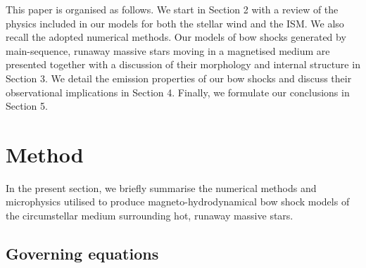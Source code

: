 \documentclass[useAMS,usenatbib]{mn2e}
\begin{document}
This paper is organised as follows. We start in Section 2 with a review of the
physics included in our models for both the stellar wind and the ISM. We also
recall the adopted numerical methods. Our models of bow shocks generated by
main-sequence, runaway massive stars moving in a magnetised medium are presented
together with a discussion of their morphology and internal structure in Section
3. We detail the emission properties of our bow shocks and discuss their observational 
implications in Section 4. Finally, we formulate our conclusions in Section 5. 




\section{Method}
\label{sect:methods}


In the present section, we briefly summarise the numerical methods and
microphysics utilised to produce magneto-hydrodynamical bow shock models of
the circumstellar medium surrounding hot, runaway massive stars.


\subsection{Governing equations}
\label{sect:eq}
\end{document}
